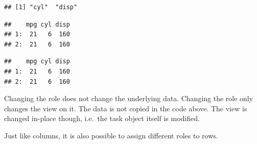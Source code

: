 \documentclass[]{scrbook}
\newenvironment{Shaded}{\begin{snugshade}}{\end{snugshade}}
\newcommand{\CommentTok}[1]{\textcolor[rgb]{0.56,0.35,0.01}{\textit{#1}}}
\newcommand{\DataTypeTok}[1]{\textcolor[rgb]{0.13,0.29,0.53}{#1}}
\newcommand{\DecValTok}[1]{\textcolor[rgb]{0.00,0.00,0.81}{#1}}
\newcommand{\KeywordTok}[1]{\textcolor[rgb]{0.13,0.29,0.53}{\textbf{#1}}}
\newcommand{\NormalTok}[1]{#1}
\newcommand{\OperatorTok}[1]{\textcolor[rgb]{0.81,0.36,0.00}{\textbf{#1}}}
\newcommand{\StringTok}[1]{\textcolor[rgb]{0.31,0.60,0.02}{#1}}
\renewenvironment{Shaded} {\begin{snugshade}\small} {\end{snugshade}}
\begin{document}
\begin{Shaded}
\end{Shaded}

\begin{verbatim}
## [1] "cyl"  "disp"
\end{verbatim}

\begin{Shaded}
\end{Shaded}

\begin{verbatim}
##    mpg cyl disp
## 1:  21   6  160
## 2:  21   6  160
\end{verbatim}

\begin{Shaded}
\end{Shaded}

\begin{verbatim}
##    mpg cyl disp
## 1:  21   6  160
## 2:  21   6  160
\end{verbatim}

Changing the role does not change the underlying data.
Changing the role only changes the view on it.
The data is not copied in the code above.
The view is changed in-place though, i.e.~the task object itself is modified.

Just like columns, it is also possible to assign different roles to rows.
\end{document}
